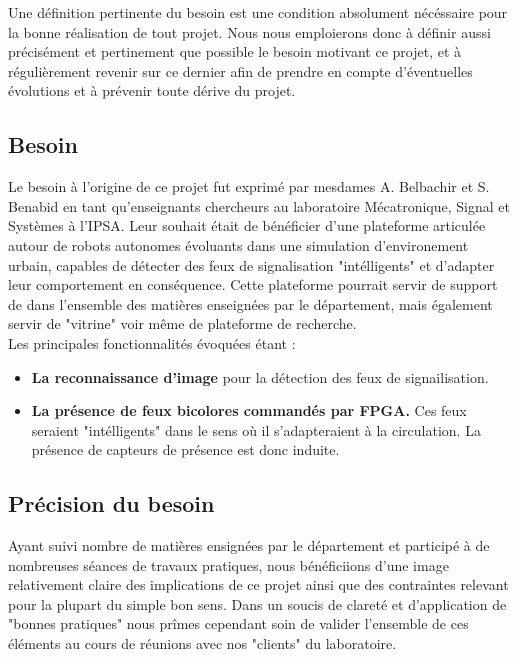 Une définition pertinente du besoin est une condition absolument nécéssaire pour la bonne réalisation de tout projet. Nous nous emploierons donc à définir aussi précisément et pertinement que possible le besoin motivant ce projet, et à régulièrement revenir sur ce dernier afin de prendre en compte d'éventuelles évolutions et à prévenir toute dérive du projet.

\subsection{Besoin}
Le besoin à l'origine de ce projet fut exprimé par mesdames A. Belbachir et S. Benabid en tant qu'enseignants chercheurs au laboratoire Mécatronique, Signal et Systèmes à l'IPSA. Leur souhait était de bénéficier d'une plateforme articulée autour de robots autonomes évoluants dans une simulation d'environement urbain, capables de détecter des feux de signalisation "intélligents" et d'adapter leur comportement en conséquence. Cette plateforme pourrait servir de support de  dans l'ensemble des matières enseignées par le département, mais également servir de "vitrine" voir même de plateforme de recherche.\\

Les principales fonctionnalités évoquées étant :
\begin{itemize}
	\item \textbf{La reconnaissance d'image} pour la détection des feux de signailisation.
	\item \textbf{La présence de feux bicolores commandés par FPGA.} Ces feux seraient "intélligents" dans le sens où il s'adapteraient à la circulation. La présence de capteurs de présence est donc induite.
\end{itemize}

\subsection{Précision du besoin}

Ayant suivi nombre de matières ensignées par le département et participé à de nombreuses séances de travaux pratiques, nous bénéficiions d'une image relativement claire des implications de ce projet ainsi que des contraintes relevant pour la plupart du simple bon sens.
Dans un soucis de clareté et d'application de "bonnes pratiques" nous prîmes cependant soin de valider l'ensemble de ces éléments au cours de réunions avec nos "clients" du laboratoire.\\


